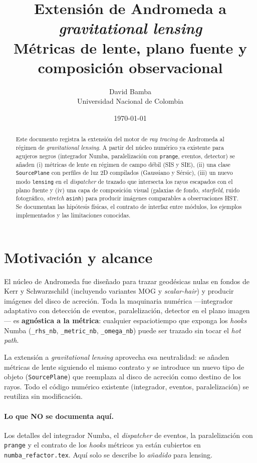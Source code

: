 \documentclass[11pt,a4paper]{article}
\title{Extensión de Andromeda a \emph{gravitational lensing}\\
\large Métricas de lente, plano fuente y composición observacional}
\author{David Bamba\\\small Universidad Nacional de Colombia}
\date{\today}
\begin{document}
\maketitle

\begin{abstract}
Este documento registra la extensión del motor de \emph{ray tracing} de
Andromeda al régimen de \emph{gravitational lensing}. A partir del núcleo
numérico ya existente para agujeros negros (integrador Numba, paralelización
con \texttt{prange}, eventos, detector) se añaden (i) métricas de lente en
régimen de campo débil (SIS y SIE), (ii) una clase \texttt{SourcePlane} con
perfiles de luz 2D compilados (Gaussiano y Sérsic), (iii) un nuevo modo
\texttt{lensing} en el \emph{dispatcher} de trazado que intersecta los rayos
escapados con el plano fuente y (iv) una capa de composición visual
(galaxias de fondo, \emph{starfield}, ruido fotográfico, \emph{stretch}
\texttt{asinh}) para producir imágenes comparables a observaciones HST.
Se documentan las hipótesis físicas, el contrato de interfaz entre módulos,
los ejemplos implementados y las limitaciones conocidas.
\end{abstract}

\tableofcontents

\bigskip


\section{Motivación y alcance}

El núcleo de Andromeda fue diseñado para trazar geodésicas nulas en fondos
de Kerr y Schwarzschild (incluyendo variantes MOG y \emph{scalar-hair}) y
producir imágenes del disco de acreción. Toda la maquinaria numérica
---integrador adaptativo con detección de eventos, paralelización, detector
en el plano imagen--- es \textbf{agnóstica a la métrica}: cualquier
espaciotiempo que exponga los \emph{hooks} Numba
(\texttt{\_rhs\_nb}, \texttt{\_metric\_nb}, \texttt{\_omega\_nb}) puede
ser trazado sin tocar el \emph{hot path}.

La extensión a \emph{gravitational lensing} aprovecha esa neutralidad:
se añaden métricas de lente siguiendo el mismo contrato y se introduce un
nuevo tipo de objeto (\texttt{SourcePlane}) que reemplaza al disco de
acreción como destino de los rayos. Todo el código numérico existente
(integrador, eventos, paralelización) se reutiliza sin modificación.

\paragraph{Lo que NO se documenta aquí.}
Los detalles del integrador Numba, el \emph{dispatcher} de eventos, la
paralelización con \texttt{prange} y el contrato de los \emph{hooks}
métricos ya están cubiertos en \texttt{numba\_refactor.tex}. Aquí solo
se describe lo \emph{añadido} para lensing.
\end{document}
